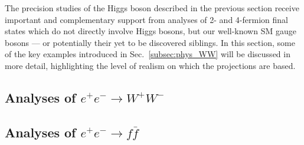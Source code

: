 
The precision studies of the Higgs boson described in the previous section receive important and complementary support from analyses of 2- and 4-fermion final states which do not directly involve Higgs bosons, but our well-known SM gauge bosons --- or potentially their yet to be discovered siblings. In this section, some of the key examples introduced in Sec.~\ref{subsec:phys_WW}  will be discussed in more detail, highlighting the level of realism on which the projections are based. 


\subsection{Analyses of $e^+e^- \to W^+W^-$} 
\label{subsec:ew_WWana}



\subsection{Analyses of $e^+e^- \to f \bar{f}$}
\label{subsec:ew_ffana}




